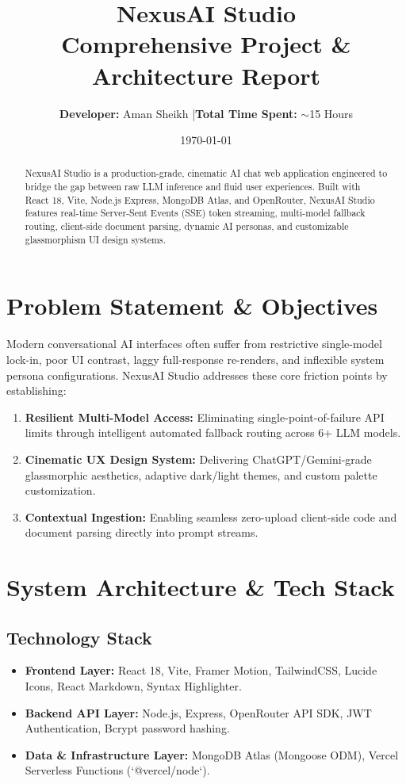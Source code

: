 \documentclass[11pt,a4paper]{article}
\title{\textbf{\Huge NexusAI Studio}\\ \vspace{0.2cm} \large Comprehensive Project \& Architecture Report}
\author{\textbf{Developer:} Aman Sheikh \quad|\quad \textbf{Total Time Spent:} $\sim$15 Hours}
\date{\today}
\begin{document}
\maketitle

\begin{abstract}
NexusAI Studio is a production-grade, cinematic AI chat web application engineered to bridge the gap between raw LLM inference and fluid user experiences. Built with React 18, Vite, Node.js Express, MongoDB Atlas, and OpenRouter, NexusAI Studio features real-time Server-Sent Events (SSE) token streaming, multi-model fallback routing, client-side document parsing, dynamic AI personas, and customizable glassmorphism UI design systems.
\end{abstract}

\section{Problem Statement \& Objectives}
Modern conversational AI interfaces often suffer from restrictive single-model lock-in, poor UI contrast, laggy full-response re-renders, and inflexible system persona configurations. NexusAI Studio addresses these core friction points by establishing:
\begin{enumerate}[leftmargin=*]
  \item \textbf{Resilient Multi-Model Access:} Eliminating single-point-of-failure API limits through intelligent automated fallback routing across 6+ LLM models.
  \item \textbf{Cinematic UX Design System:} Delivering ChatGPT/Gemini-grade glassmorphic aesthetics, adaptive dark/light themes, and custom palette customization.
  \item \textbf{Contextual Ingestion:} Enabling seamless zero-upload client-side code and document parsing directly into prompt streams.
\end{enumerate}

\section{System Architecture \& Tech Stack}

\subsection{Technology Stack}
\begin{itemize}[leftmargin=*]
  \item \textbf{Frontend Layer:} React 18, Vite, Framer Motion, TailwindCSS, Lucide Icons, React Markdown, Syntax Highlighter.
  \item \textbf{Backend API Layer:} Node.js, Express, OpenRouter API SDK, JWT Authentication, Bcrypt password hashing.
  \item \textbf{Data \& Infrastructure Layer:} MongoDB Atlas (Mongoose ODM), Vercel Serverless Functions (`@vercel/node`).
\end{itemize}
\end{document}
